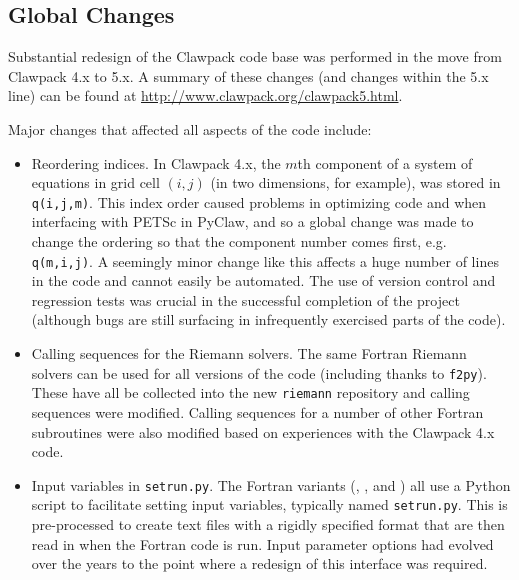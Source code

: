 %
%
%

\subsection{Global Changes}
Substantial redesign of the Clawpack code base was performed in the move
from Clawpack 4.x to 5.x.  A summary of these changes (and changes within
the 5.x line) can be found at \url{http://www.clawpack.org/clawpack5.html}.

Major changes that affected all aspects of the code include:
\begin{itemize}
    \item Reordering indices.  In Clawpack 4.x, the $m$th component of a
system of equations in grid cell $(i,j)$ (in two dimensions, for example),
was stored in \texttt{q(i,j,m)}.  This index order caused problems in
optimizing code and when interfacing with PETSc in PyClaw, and so a global
change was made to change the ordering so that the component number comes
first, e.g. \texttt{q(m,i,j)}.  A seemingly minor change like this affects a
huge number of lines in the code and cannot easily be automated. The use of
version control and regression tests was crucial in the successful
completion of the project (although bugs are still surfacing in infrequently
exercised parts of the code).
    \item Calling sequences for the Riemann solvers.  The same Fortran
Riemann solvers can be used for all versions of the code (including \pyclaw
thanks to \texttt{f2py}).  These have all be collected into the new
\texttt{riemann} repository and calling sequences were modified.  Calling
sequences for a number of other Fortran subroutines were also modified based
on experiences with the Clawpack 4.x code.
    \item Input variables in \texttt{setrun.py}.  The Fortran variants
(\classic, \amrclaw, and \geoclaw) all use a Python script to facilitate
setting input variables, typically named \texttt{setrun.py}.  This is
pre-processed to create text files with a rigidly specified format that are
then read in when the Fortran code is run.  Input parameter options had
evolved over the years to the point where a redesign of this interface was
required.
\end{itemize}
